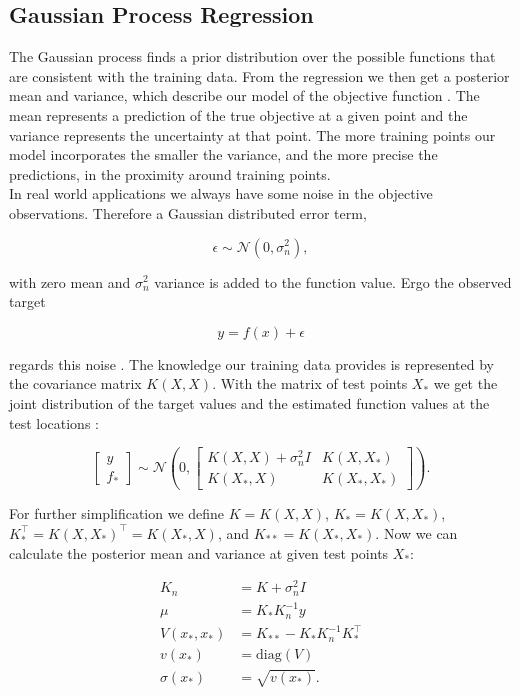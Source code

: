 \subsection{Gaussian Process Regression}
The Gaussian process finds a prior distribution over the possible functions that are consistent with the training data. From the regression we then get a posterior mean and variance, which describe our model of the objective function \cite{rasmussen2006gaussian}. The mean represents a prediction of the true objective at a given point and the variance represents the uncertainty at that point. The more training points our model incorporates the smaller the variance, and the more precise the predictions, in the proximity around training points.\\
In real world applications we always have some noise in the objective observations. Therefore a Gaussian distributed error term,

$$\epsilon \sim \mathcal{N}(0,\sigma_n^2),$$

with zero mean and $\sigma_n^2$ variance is added to the function value. Ergo the observed target

$$y = f(x) + \epsilon$$

regards this noise \cite{brochu2010tutorial,rasmussen2006gaussian,lizotte2008practical,shahriari2016taking}. The knowledge our training data provides is represented by the covariance matrix $K(X,X)$. With the matrix of test points $X_*$ we get the joint distribution of the target values and the estimated function values at the test locations \cite{rasmussen2006gaussian}:

$$\left[ \begin{array}{c} y \\ f_* \end{array} \right] \sim \mathcal{N} \left(0, \begin{bmatrix} K(X,X)+\sigma_n^2 I & K(X,X_*) \\ K(X_*,X) & K(X_*,X_*) \end{bmatrix} \right).$$

For further simplification we define $K = K(X,X)$, $K_* = K(X,X_*)$, $K_*^{\top} = K(X,X_*)^{\top} = K(X_*,X)$, and $K_{**} = K(X_*,X_*)$. Now we can calculate the posterior mean and variance at given test points $X_*$:

\begin{align}
    K_n &= K+\sigma_n^2 I \label{eq:kNoise} \\
    \mu &= K_*K_n^{-1}y \label{eq:meanGauss} \\
    V(x_*,x_*) &= K_{**}-K_*K_n^{-1}K_*^\top \label{eq:wholeVar} \\
    v(x_*) &= \mathrm{diag}(V) \label{eq:vectorVar} \\
    \sigma(x_*) &= \sqrt{v(x_*)}. \label{eq:gp:stdv}\\ \nonumber
\end{align}

